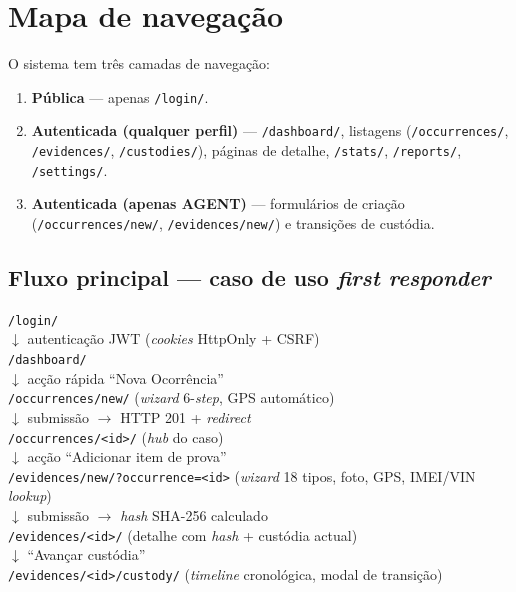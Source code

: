 \documentclass[a4paper,11pt]{article}
\begin{document}
\newpage

\section{Mapa de navegação}

O sistema tem três camadas de navegação:

\begin{enumerate}[leftmargin=*]
    \item \textbf{Pública} --- apenas \texttt{/login/}.
    \item \textbf{Autenticada (qualquer perfil)} --- \texttt{/dashboard/}, listagens
        (\texttt{/occurrences/}, \texttt{/evidences/}, \texttt{/custodies/}),
        páginas de detalhe, \texttt{/stats/}, \texttt{/reports/}, \texttt{/settings/}.
    \item \textbf{Autenticada (apenas AGENT)} --- formulários de criação
        (\texttt{/occurrences/new/}, \texttt{/evidences/new/}) e transições de custódia.
\end{enumerate}

\subsection*{Fluxo principal --- caso de uso \textit{first responder}}

\begin{tcolorbox}[colback=gray!5, colframe=forensicgray]
\texttt{/login/} \\
\hspace*{1em}$\downarrow$ autenticação JWT (\textit{cookies} HttpOnly + CSRF) \\
\texttt{/dashboard/} \\
\hspace*{1em}$\downarrow$ acção rápida ``Nova Ocorrência'' \\
\texttt{/occurrences/new/} \quad (\textit{wizard} 6-\textit{step}, GPS automático) \\
\hspace*{1em}$\downarrow$ submissão $\rightarrow$ HTTP 201 + \textit{redirect} \\
\texttt{/occurrences/<id>/} \quad (\textit{hub} do caso) \\
\hspace*{1em}$\downarrow$ acção ``Adicionar item de prova'' \\
\texttt{/evidences/new/?occurrence=<id>} \quad (\textit{wizard} 18 tipos, foto, GPS, IMEI/VIN \textit{lookup}) \\
\hspace*{1em}$\downarrow$ submissão $\rightarrow$ \textit{hash} SHA-256 calculado \\
\texttt{/evidences/<id>/} \quad (detalhe com \textit{hash} + custódia actual) \\
\hspace*{1em}$\downarrow$ ``Avançar custódia'' \\
\texttt{/evidences/<id>/custody/} \quad (\textit{timeline} cronológica, modal de transição)
\end{tcolorbox}
\end{document}
